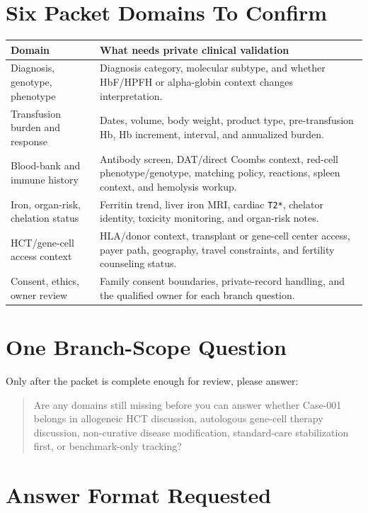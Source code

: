 \documentclass[11pt]{article}
\begin{document}
\section*{Six Packet Domains To Confirm}

\begin{tabularx}{\textwidth}{@{}p{}Y@{}}
\toprule
Domain & What needs private clinical validation \\
\midrule
Diagnosis, genotype, phenotype & Diagnosis category, molecular subtype, and
whether HbF/HPFH or alpha-globin context changes interpretation. \\
Transfusion burden and response & Dates, volume, body weight, product type,
pre-transfusion Hb, Hb increment, interval, and annualized burden. \\
Blood-bank and immune history & Antibody screen, DAT/direct Coombs context,
red-cell phenotype/genotype, matching policy, reactions, spleen context, and
hemolysis workup. \\
Iron, organ-risk, chelation status & Ferritin trend, liver iron MRI, cardiac
\texttt{T2*}, chelator identity, toxicity monitoring, and organ-risk notes. \\
HCT/gene-cell access context & HLA/donor context, transplant or gene-cell
center access, payer path, geography, travel constraints, and fertility
counseling status. \\
Consent, ethics, owner review & Family consent boundaries, private-record
handling, and the qualified owner for each branch question. \\
\bottomrule
\end{tabularx}

\section*{One Branch-Scope Question}

Only after the packet is complete enough for review, please answer:

\begin{quote}
Are any domains still missing before you can answer whether Case-001 belongs
in allogeneic HCT discussion, autologous gene-cell therapy discussion,
non-curative disease modification, standard-care stabilization first, or
benchmark-only tracking?
\end{quote}

\section*{Answer Format Requested}
\end{document}
